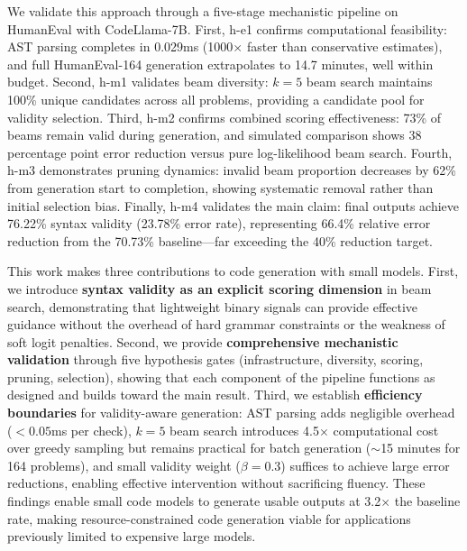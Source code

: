 We validate this approach through a five-stage mechanistic pipeline on HumanEval with CodeLlama-7B. First, h-e1 confirms computational feasibility: AST parsing completes in 0.029ms (1000$\times$ faster than conservative estimates), and full HumanEval-164 generation extrapolates to 14.7 minutes, well within budget. Second, h-m1 validates beam diversity: $k=5$ beam search maintains 100\% unique candidates across all problems, providing a candidate pool for validity selection. Third, h-m2 confirms combined scoring effectiveness: 73\% of beams remain valid during generation, and simulated comparison shows 38 percentage point error reduction versus pure log-likelihood beam search. Fourth, h-m3 demonstrates pruning dynamics: invalid beam proportion decreases by 62\% from generation start to completion, showing systematic removal rather than initial selection bias. Finally, h-m4 validates the main claim: final outputs achieve 76.22\% syntax validity (23.78\% error rate), representing 66.4\% relative error reduction from the 70.73\% baseline---far exceeding the 40\% reduction target.

This work makes three contributions to code generation with small models. First, we introduce \textbf{syntax validity as an explicit scoring dimension} in beam search, demonstrating that lightweight binary signals can provide effective guidance without the overhead of hard grammar constraints or the weakness of soft logit penalties. Second, we provide \textbf{comprehensive mechanistic validation} through five hypothesis gates (infrastructure, diversity, scoring, pruning, selection), showing that each component of the pipeline functions as designed and builds toward the main result. Third, we establish \textbf{efficiency boundaries} for validity-aware generation: AST parsing adds negligible overhead ($<0.05$ms per check), $k=5$ beam search introduces 4.5$\times$ computational cost over greedy sampling but remains practical for batch generation ($\sim$15 minutes for 164 problems), and small validity weight ($\beta=0.3$) suffices to achieve large error reductions, enabling effective intervention without sacrificing fluency. These findings enable small code models to generate usable outputs at 3.2$\times$ the baseline rate, making resource-constrained code generation viable for applications previously limited to expensive large models.
